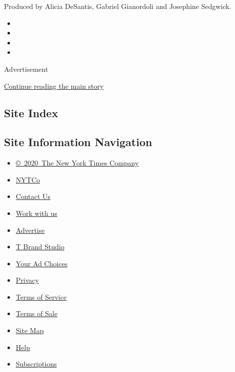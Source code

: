 Produced by Alicia DeSantis, Gabriel Gianordoli and Josephine Sedgwick.

\begin{itemize}
\item
\item
\item
\item
\end{itemize}

Advertisement

\protect\hyperlink{after-bottom}{Continue reading the main story}

\hypertarget{site-index}{%
\subsection{Site Index}\label{site-index}}

\hypertarget{site-information-navigation}{%
\subsection{Site Information
Navigation}\label{site-information-navigation}}

\begin{itemize}
\tightlist
\item
  \href{https://help.nytimes.com/hc/en-us/articles/115014792127-Copyright-notice}{©~2020~The
  New York Times Company}
\end{itemize}

\begin{itemize}
\tightlist
\item
  \href{https://www.nytco.com/}{NYTCo}
\item
  \href{https://help.nytimes.com/hc/en-us/articles/115015385887-Contact-Us}{Contact
  Us}
\item
  \href{https://www.nytco.com/careers/}{Work with us}
\item
  \href{https://nytmediakit.com/}{Advertise}
\item
  \href{http://www.tbrandstudio.com/}{T Brand Studio}
\item
  \href{https://www.nytimes.com/privacy/cookie-policy\#how-do-i-manage-trackers}{Your
  Ad Choices}
\item
  \href{https://www.nytimes.com/privacy}{Privacy}
\item
  \href{https://help.nytimes.com/hc/en-us/articles/115014893428-Terms-of-service}{Terms
  of Service}
\item
  \href{https://help.nytimes.com/hc/en-us/articles/115014893968-Terms-of-sale}{Terms
  of Sale}
\item
  \href{https://spiderbites.nytimes.com}{Site Map}
\item
  \href{https://help.nytimes.com/hc/en-us}{Help}
\item
  \href{https://www.nytimes.com/subscription?campaignId=37WXW}{Subscriptions}
\end{itemize}
